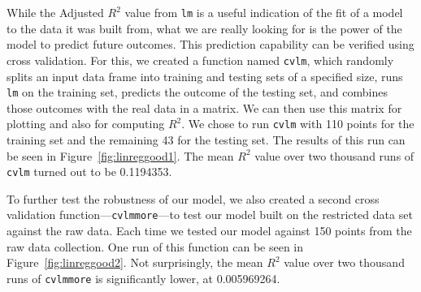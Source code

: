 \documentclass{article}
\begin{document}
While the Adjusted $R^2$ value from \verb=lm= is a useful indication of the fit
of a model to the data it was built from, what we are really looking for is the
power of the model to predict future outcomes. This prediction capability can
be verified using cross validation. For this, we created a function named
\verb=cvlm=, which randomly splits an input data frame into training and
testing sets of a specified size, runs \verb=lm= on the training set, predicts
the outcome of the testing set, and combines those outcomes with the real data
in a matrix. We can then use this matrix for plotting and also for computing
$R^2$. We chose to run \verb=cvlm= with 110 points for the training set and the
remaining 43 for the testing set. The results of this run can be seen in
Figure~\ref{fig:linreggood1}. The mean $R^2$ value over two thousand runs of
\verb=cvlm= turned out to be 0.1194353.

To further test the robustness of our model, we also created a second cross
validation function---\verb=cvlmmore=---to test our model built on the
restricted data set against the raw data. Each time we tested our model against
150 points from the raw data collection. One run of this function can be seen
in Figure~\ref{fig:linreggood2}. Not surprisingly, the mean $R^2$ value over
two thousand runs of \verb=cvlmmore= is significantly lower, at 0.005969264.
\end{document}
